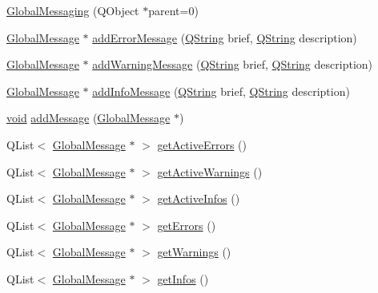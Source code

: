 \begin{DoxyCompactItemize}
\item 
\hyperlink{group___core_plugin_ga38edb7cbf48000dc01e7b3221af4f2e5}{\-Global\-Messaging} (\-Q\-Object $\ast$parent=0)
\item 
\hyperlink{class_core_1_1_global_message}{\-Global\-Message} $\ast$ \hyperlink{group___core_plugin_ga6a4a87e17bd2e18c6edfdcfcf2c8110f}{add\-Error\-Message} (\hyperlink{group___u_a_v_objects_plugin_gab9d252f49c333c94a72f97ce3105a32d}{\-Q\-String} brief, \hyperlink{group___u_a_v_objects_plugin_gab9d252f49c333c94a72f97ce3105a32d}{\-Q\-String} description)
\item 
\hyperlink{class_core_1_1_global_message}{\-Global\-Message} $\ast$ \hyperlink{group___core_plugin_ga57358d48eab5fd8fb7741daa9fa5244a}{add\-Warning\-Message} (\hyperlink{group___u_a_v_objects_plugin_gab9d252f49c333c94a72f97ce3105a32d}{\-Q\-String} brief, \hyperlink{group___u_a_v_objects_plugin_gab9d252f49c333c94a72f97ce3105a32d}{\-Q\-String} description)
\item 
\hyperlink{class_core_1_1_global_message}{\-Global\-Message} $\ast$ \hyperlink{group___core_plugin_gab22b7c8008fd1803cb7c9454e9b0b6ec}{add\-Info\-Message} (\hyperlink{group___u_a_v_objects_plugin_gab9d252f49c333c94a72f97ce3105a32d}{\-Q\-String} brief, \hyperlink{group___u_a_v_objects_plugin_gab9d252f49c333c94a72f97ce3105a32d}{\-Q\-String} description)
\item 
\hyperlink{group___u_a_v_objects_plugin_ga444cf2ff3f0ecbe028adce838d373f5c}{void} \hyperlink{group___core_plugin_ga84d8602d51725819aa01a780228ec680}{add\-Message} (\hyperlink{class_core_1_1_global_message}{\-Global\-Message} $\ast$)
\item 
\-Q\-List$<$ \hyperlink{class_core_1_1_global_message}{\-Global\-Message} $\ast$ $>$ \hyperlink{group___core_plugin_ga954e7a8f68b28e184a6a78d796fd1460}{get\-Active\-Errors} ()
\item 
\-Q\-List$<$ \hyperlink{class_core_1_1_global_message}{\-Global\-Message} $\ast$ $>$ \hyperlink{group___core_plugin_ga5eb61031e9fe3f0b3dc6e9b4b56ec1a6}{get\-Active\-Warnings} ()
\item 
\-Q\-List$<$ \hyperlink{class_core_1_1_global_message}{\-Global\-Message} $\ast$ $>$ \hyperlink{group___core_plugin_gae228917eca7ba668fa70bcda27ff3067}{get\-Active\-Infos} ()
\item 
\-Q\-List$<$ \hyperlink{class_core_1_1_global_message}{\-Global\-Message} $\ast$ $>$ \hyperlink{group___core_plugin_gae1fc9548dca8947796b625256b217cf6}{get\-Errors} ()
\item 
\-Q\-List$<$ \hyperlink{class_core_1_1_global_message}{\-Global\-Message} $\ast$ $>$ \hyperlink{group___core_plugin_ga0ed7555de2d566e21edbb19af678a83e}{get\-Warnings} ()
\item 
\-Q\-List$<$ \hyperlink{class_core_1_1_global_message}{\-Global\-Message} $\ast$ $>$ \hyperlink{group___core_plugin_ga80c83327d603cfb00595f59c7503c3d1}{get\-Infos} ()
\end{DoxyCompactItemize}


